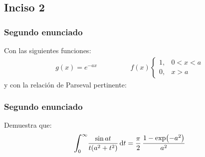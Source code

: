 \subsection{Inciso 2}

\begin{frame}
\frametitle{Segundo enunciado}
Con las siguientes funciones:
\begin{align*}
g (x) = e^{-a x} \hspace{2cm} f (x) \begin{cases}
1, & 0 < x < a \\
0, & x > a
\end{cases} 
\end{align*}
y con la relación de Parseval pertinente:
\end{frame}
\begin{frame}
\frametitle{Segundo enunciado}
Demuestra que:
\begin{align*}
\scaleint{6ex}_{\bs 0}^{\infty} \dfrac{\sin a t}{t (a^{2} + t^{2})} \dd{t} = \dfrac{\pi}{2} \, \dfrac{1 - \exp(-a^{2})}{a^{2}}
\end{align*}
\end{frame}
